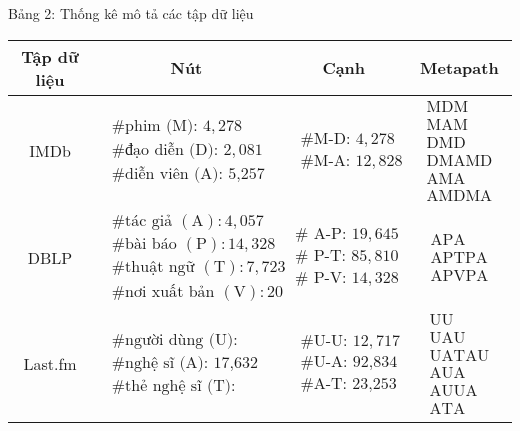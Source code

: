 Bảng 2: Thống kê mô tả các tập dữ liệu
\begin{center}
\begin{tabular}{|c|c|c|c|}
\hline
Tập dữ liệu & Nút & Cạnh & Metapath \\
\hline
$\mathrm{IMDb}$ & $\begin{array}{l}\text { \# phim (M): } 4,278 \\ \text { \# đạo diễn (D): } 2,081 \\ \text { \# diễn viên (A): 5,257 }\end{array}$ & $\begin{array}{l}\text { \# M-D: } 4,278 \\ \text { \# M-A: } 12,828\end{array}$ & $\begin{array}{c}\text { MDM } \\ \text { MAM } \\ \text { DMD } \\ \text { DMAMD } \\ \text { AMA } \\ \text { AMDMA }\end{array}$ \\
\hline
DBLP & $\begin{array}{l}\text { \# tác giả }(\mathrm{A}): 4,057 \\ \text { \# bài báo }(\mathrm{P}): 14,328 \\ \text { \# thuật ngữ }(\mathrm{T}): 7,723 \\ \text { \# nơi xuất bản }(\mathrm{V}): 20\end{array}$ & $\begin{array}{l}\# \text { A-P: } 19,645 \\ \# \text { P-T: } 85,810 \\ \# \text { P-V: } 14,328\end{array}$ & $\begin{array}{c}\mathrm{APA} \\ \mathrm{APTPA} \\ \mathrm{APVPA}\end{array}$ \\
\hline
Last.fm & $\begin{array}{l}\text { \# người dùng (U): 1,892 } \\ \text { \# nghệ sĩ (A): 17,632 } \\ \text { \# thẻ nghệ sĩ (T): 1,088 }\end{array}$ & $\begin{array}{l}\text { \# U-U: } 12,717 \\ \text { \# U-A: 92,834 } \\ \text { \# A-T: 23,253 }\end{array}$ & $\begin{array}{c}\text { UU } \\ \text { UAU } \\ \text { UATAU } \\ \text { AUA } \\ \text { AUUA } \\ \text { ATA }\end{array}$ \\
\hline
\end{tabular}
\end{center}
